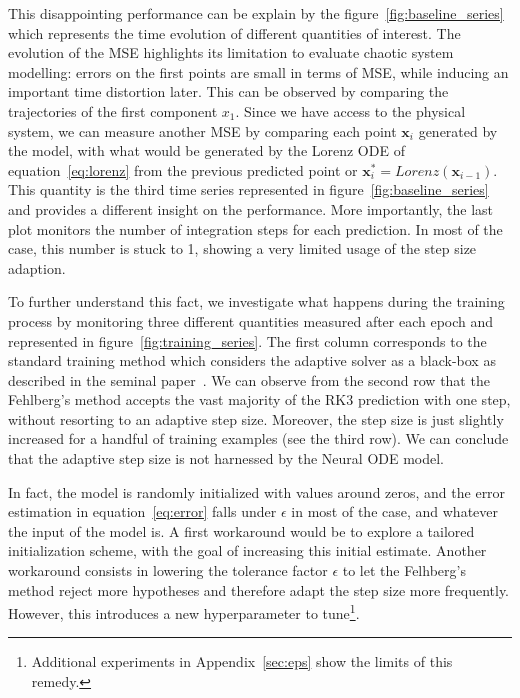 \documentclass{article}
\newcommand{\x}{\ensuremath{\mathbf{x}}} %
\newcommand{\eps}{\ensuremath{\epsilon}}
\begin{document}
This disappointing performance can be explain by the
figure~\ref{fig:baseline_series} which represents the time evolution
of different quantities of interest. The evolution of the MSE
highlights its limitation to evaluate chaotic system modelling:
errors on the first points are small in terms of MSE, while 
inducing an important time distortion later. This can be observed by comparing the
trajectories of the first component $x_1$. Since we have access to the
physical system, we can measure another MSE by comparing each point
$\x_i$ generated by the model, with what would be generated by the
Lorenz ODE of equation~\ref{eq:lorenz} from the previous predicted
point or $\x_i^*=Lorenz(\x_{i-1})$. This quantity is the third time
series represented in figure~\ref{fig:baseline_series} and provides a
different insight on the performance.  More importantly, the last plot
monitors the number of integration steps for each prediction. In most
of the case, this number is stuck to 1, showing a very limited usage
of the step size adaption.


To further understand this fact, we investigate what happens during
the training process by monitoring three different quantities measured
after each epoch and represented in figure~\ref{fig:training_series}. 
The first column corresponds to the standard training method which
considers the adaptive solver as a black-box as described in the
seminal paper~\cite{Chen18NODE}. We can observe from the second row
that the Fehlberg's method accepts the vast majority of the RK3
prediction with one step, without resorting to an adaptive step
size. Moreover, the step size is just slightly increased for a handful
of training examples (see the third row). We can conclude that the
adaptive step size is not harnessed by the Neural ODE model.

In fact, the model is randomly initialized with values around zeros,
and the error estimation in equation~\ref{eq:error} falls under $\eps$
in most of the case, and whatever the input of the model is. A first
workaround would be to explore a tailored initialization scheme, with
the goal of increasing this initial estimate. Another workaround
consists in lowering the tolerance factor $\eps$ to let the Felhberg's
method reject more hypotheses and therefore adapt the step size more
frequently.  However, this introduces a new hyperparameter to
tune\footnote{Additional experiments in Appendix~\ref{sec:eps} show the limits of this remedy.}. 
\end{document}
